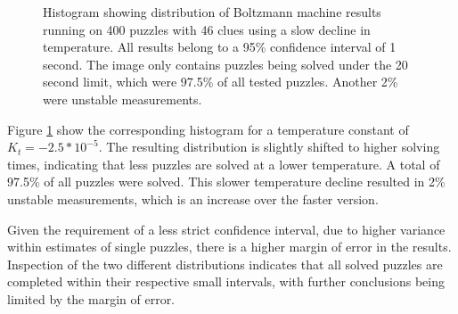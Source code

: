 \documentclass[a4paper,11pt]{kth-mag}
\begin{document}
\begin{figure}[here] 
\noindent{}
\vspace{-15pt}
\caption[Histogram with distribution of Boltzmann machine with slow decline]{Histogram showing distribution of Boltzmann machine results running on 400 puzzles with 46 clues using a slow decline in temperature. All results belong to a 95\% confidence interval of 1 second. The image only contains puzzles being solved under the 20 second limit, which were 97.5\% of all tested puzzles. Another 2\% were unstable measurements.}
\label{fig:boltzmannMedium}
\end{figure}

Figure \ref{fig:boltzmannMedium} show the corresponding histogram for a temperature constant of $K_t = -2.5*10^{-5}$.
The resulting distribution is slightly shifted to higher solving times, indicating that less puzzles are solved at a lower temperature.
A total of 97.5\% of all puzzles were solved.
This slower temperature decline resulted in 2\% unstable measurements, which is an increase over the faster version. 

Given the requirement of a less strict confidence interval, due to higher variance within estimates of single puzzles, there is a higher margin of error in the results.
Inspection of the two different distributions indicates that all solved puzzles are completed within their respective small intervals, with further conclusions being limited by the margin of error. 
\end{document}
